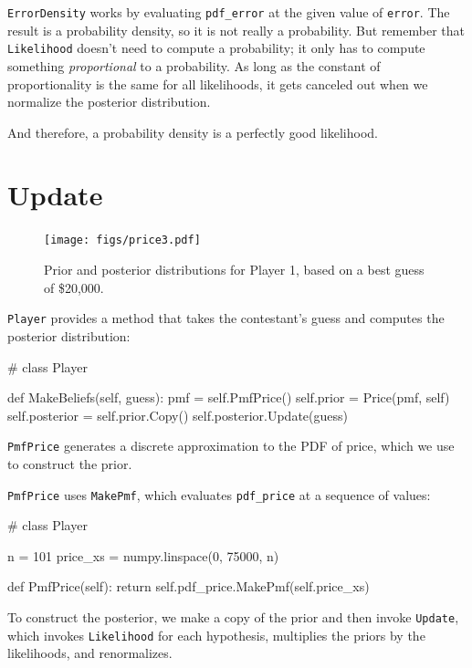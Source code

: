 \documentclass[12pt]{book}
\theoremstyle{exercise}
\begin{document}
{\tt ErrorDensity} works by evaluating \verb"pdf_error" at
the given value of {\tt error}.
The result is a probability density, so it is not really a probability.
But remember that {\tt Likelihood} doesn't
need to compute a probability; it only has to compute something {\em
  proportional} to a probability.  As long as the constant of
proportionality is the same for all likelihoods, it gets canceled out
when we normalize the posterior distribution.

And therefore, a probability density is a perfectly good likelihood.


\section{Update}

\begin{figure}
\centerline{\texttt{[image: figs/price3.pdf]}}
\caption{Prior and posterior distributions for Player 1, based on
  a best guess of \$20,000.}
\label{fig.price3}
\end{figure}


{\tt Player} provides a method that takes the contestant's
guess and computes the posterior distribution:

\begin{code}
# class Player

    def MakeBeliefs(self, guess):
        pmf = self.PmfPrice()
        self.prior = Price(pmf, self)
        self.posterior = self.prior.Copy()
        self.posterior.Update(guess)
\end{code}

{\tt PmfPrice} generates a discrete approximation
to the PDF of price, which we use to construct the prior.

{\tt PmfPrice} uses {\tt MakePmf}, which
evaluates \verb"pdf_price" at a sequence of values:

\begin{code}
# class Player

    n = 101
    price_xs = numpy.linspace(0, 75000, n)

    def PmfPrice(self):
        return self.pdf_price.MakePmf(self.price_xs)
\end{code}

To construct the posterior, we make a copy of the
prior and then invoke {\tt Update}, which invokes {\tt Likelihood}
for each hypothesis, multiplies the priors by the likelihoods,
and  renormalizes.
\end{document}
